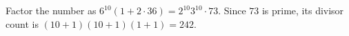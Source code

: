 Factor the number as $6^{10}(1+2\cdot36)=2^{10}3^{10}\cdot73$. Since $73$ is prime, its divisor count is $(10+1)(10+1)(1+1)=\boxed{242}$.
